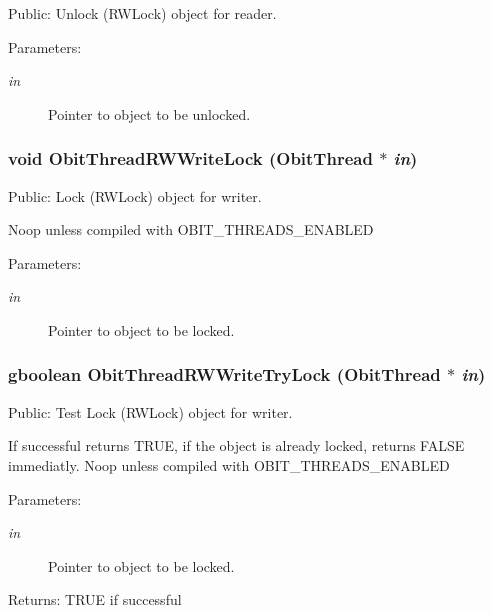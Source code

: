 Public: Unlock (RWLock) object for reader. 

\begin{Desc}
\item[Parameters:]
\begin{description}
\item[{\em in}]Pointer to object to be unlocked. \end{description}
\end{Desc}
\subsubsection{\setlength{\rightskip}{0pt plus 5cm}void Obit\-Thread\-RWWrite\-Lock ({\bf Obit\-Thread} $\ast$ {\em in})}\label{ObitThread_8h_a12}


Public: Lock (RWLock) object for writer. 

Noop unless compiled with OBIT\_\-THREADS\_\-ENABLED \begin{Desc}
\item[Parameters:]
\begin{description}
\item[{\em in}]Pointer to object to be locked. \end{description}
\end{Desc}
\subsubsection{\setlength{\rightskip}{0pt plus 5cm}gboolean Obit\-Thread\-RWWrite\-Try\-Lock ({\bf Obit\-Thread} $\ast$ {\em in})}\label{ObitThread_8h_a13}


Public: Test Lock (RWLock) object for writer. 

If successful returns TRUE, if the object is already locked, returns FALSE immediatly. Noop unless compiled with OBIT\_\-THREADS\_\-ENABLED \begin{Desc}
\item[Parameters:]
\begin{description}
\item[{\em in}]Pointer to object to be locked. \end{description}
\end{Desc}
\begin{Desc}
\item[Returns:]TRUE if successful \end{Desc}
